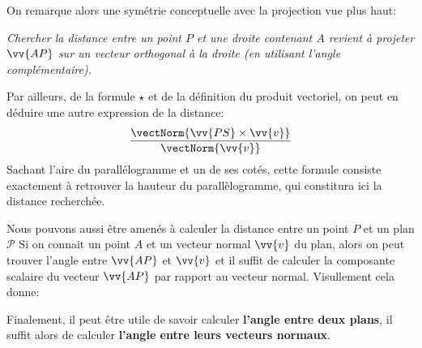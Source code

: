 On remarque alors une symétrie conceptuelle avec la projection vue plus haut: 
\begin{center}
   \textit{
      Chercher la distance entre un point \(P\) et une droite contenant \(A\) revient à\+ projeter \(\vv{AP}\) sur un vecteur orthogonal à la droite (en utilisant l'angle complémentaire).
   }
\end{center}
Par ailleurs, de la formule \(\star\) et de la définition du produit vectoriel, on peut en déduire une autre expression de la distance:
\[
   \frac{\vectNorm{\vv{PS} \times \vv{v}}}{\vectNorm{\vv{v}}}   
\]
Sachant l'aire du parallélogramme et un de ses cotés, cette formule consiste exactement à retrouver la hauteur du parallèlogramme, qui constitura ici la distance recherchée. \<

Nous pouvons aussi être amenés à calculer la distance entre un point \(P\) et un plan \(\mathscr{P}\)\+
Si on connait un point \(A\) et un vecteur normal \(\vv{v}\) du plan, alors on peut trouver l'angle entre \(\vv{AP}\) et \(\vv{v}\) et il suffit de calculer la composante scalaire du vecteur \(\vv{AP}\) par rapport au vecteur normal.\+
Visullement cela donne:
\begin{center}
\end{center}\<

Finalement, il peut être utile de savoir calculer \textbf{l'angle entre deux plans}, il suffit alors de calculer \textbf{l'angle entre leurs vecteurs normaux}.